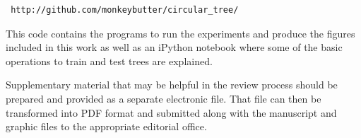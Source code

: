 \documentclass[times,twocolumn,final,authoryear]{elsarticle}
\begin{document}
\begin{verbatim}
 http://github.com/monkeybutter/circular_tree/
\end{verbatim}

This code contains the programs to run the experiments and produce the figures included in this work as well as an iPython notebook where some of the basic operations to train and test trees are explained.

Supplementary material that may be helpful in the review process should be prepared and provided as a separate electronic file. That file can then be transformed into PDF format and submitted along with the manuscript and graphic files to the appropriate editorial office.
\end{document}
